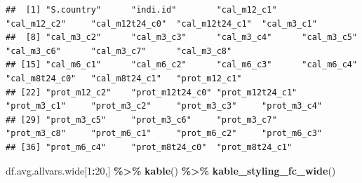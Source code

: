 \documentclass[
]{book}
\newenvironment{Shaded}{\begin{snugshade}}{\end{snugshade}}
\newcommand{\DecValTok}[1]{\textcolor[rgb]{0.00,0.00,0.81}{#1}}
\newcommand{\KeywordTok}[1]{\textcolor[rgb]{0.13,0.29,0.53}{\textbf{#1}}}
\newcommand{\NormalTok}[1]{#1}
\newcommand{\OperatorTok}[1]{\textcolor[rgb]{0.81,0.36,0.00}{\textbf{#1}}}
\newcommand{\StringTok}[1]{\textcolor[rgb]{0.31,0.60,0.02}{#1}}
\begin{document}
\begin{verbatim}
##  [1] "S.country"      "indi.id"        "cal_m12_c1"     "cal_m12_c2"     "cal_m12t24_c0"  "cal_m12t24_c1"  "cal_m3_c1"     
##  [8] "cal_m3_c2"      "cal_m3_c3"      "cal_m3_c4"      "cal_m3_c5"      "cal_m3_c6"      "cal_m3_c7"      "cal_m3_c8"     
## [15] "cal_m6_c1"      "cal_m6_c2"      "cal_m6_c3"      "cal_m6_c4"      "cal_m8t24_c0"   "cal_m8t24_c1"   "prot_m12_c1"   
## [22] "prot_m12_c2"    "prot_m12t24_c0" "prot_m12t24_c1" "prot_m3_c1"     "prot_m3_c2"     "prot_m3_c3"     "prot_m3_c4"    
## [29] "prot_m3_c5"     "prot_m3_c6"     "prot_m3_c7"     "prot_m3_c8"     "prot_m6_c1"     "prot_m6_c2"     "prot_m6_c3"    
## [36] "prot_m6_c4"     "prot_m8t24_c0"  "prot_m8t24_c1"
\end{verbatim}

\begin{Shaded}
\begin{Highlighting}[]
\NormalTok{df.avg.allvars.wide[}\DecValTok{1}\OperatorTok{:}\DecValTok{20}\NormalTok{,] }\OperatorTok{\%\textgreater{}\%}\StringTok{ }\KeywordTok{kable}\NormalTok{() }\OperatorTok{\%\textgreater{}\%}\StringTok{ }\KeywordTok{kable\_styling\_fc\_wide}\NormalTok{()}
\end{Highlighting}
\end{Shaded}
\end{document}

